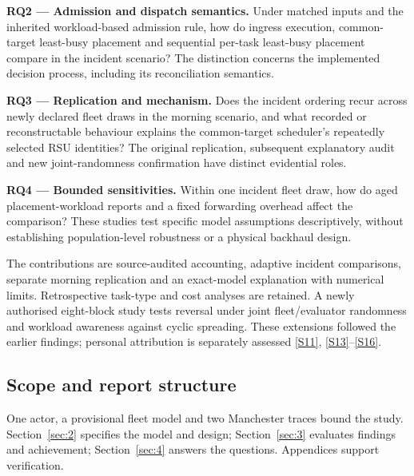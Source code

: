 \documentclass[11pt,a4paper]{article}
\begin{document}
\textbf{RQ2 --- Admission and dispatch semantics.} Under matched inputs and the inherited workload-based admission rule, how do ingress execution, common-target least-busy placement and sequential per-task least-busy placement compare in the incident scenario? The distinction concerns the implemented decision process, including its reconciliation semantics.

\textbf{RQ3 --- Replication and mechanism.} Does the incident ordering recur across newly declared fleet draws in the morning scenario, and what recorded or reconstructable behaviour explains the common-target scheduler's repeatedly selected RSU identities? The original replication, subsequent explanatory audit and new joint-randomness confirmation have distinct evidential roles.

\textbf{RQ4 --- Bounded sensitivities.} Within one incident fleet draw, how do aged placement-workload reports and a fixed forwarding overhead affect the comparison? These studies test specific model assumptions descriptively, without establishing population-level robustness or a physical backhaul design.

The contributions are source-audited accounting, adaptive incident comparisons, separate morning replication and an exact-model explanation with numerical limits. Retrospective task-type and cost analyses are retained. A newly authorised eight-block study tests reversal under joint fleet/evaluator randomness and workload awareness against cyclic spreading. These extensions followed the earlier findings; personal attribution is separately assessed \hyperref[source-s11]{[S11]}, \hyperref[source-s13]{[S13]}--\hyperref[source-s16]{[S16]}.

\subsection{Scope and report structure}\label{sec:1.4}

One actor, a provisional fleet model and two Manchester traces bound the study. Section~\ref{sec:2} specifies the model and design; Section~\ref{sec:3} evaluates findings and achievement; Section~\ref{sec:4} answers the questions. Appendices support verification.
\end{document}
